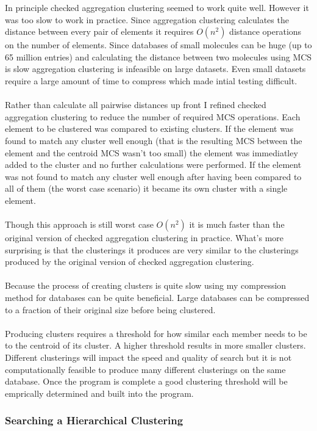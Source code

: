 \documentclass[DIV=calc, paper=a4, fontsize=12pt, twocolumn]{scrartcl}	 %
\begin{document}
In principle checked aggregation clustering seemed to work quite well. However it was too slow to work in practice. Since aggregation clustering calculates the distance between every pair of elements it requires $O(n^2)$ distance operations on the number of elements. Since databases of small molecules can be huge (up to 65 million entries) and calculating the distance between two molecules using MCS is slow aggregation clustering is infeasible on large datasets. Even small datasets require a large amount of time to compress which made intial testing difficult.
\\\\
Rather than calculate all pairwise distances up front I refined checked aggregation clustering to reduce the number of required MCS operations. Each element to be clustered was compared to existing clusters. If the element was found to match any cluster well enough (that is the resulting MCS between the element and the centroid MCS wasn't too small) the element was immediatley added to the cluster and no further calculations were performed. If the element was not found to match any cluster well enough after having been compared to all of them (the worst case scenario) it became its own cluster with a single element. 
\\\\
Though this approach is still worst case $O(n^2)$ it is much faster than the original version of checked aggregation clustering in practice. What's more surprising is that the clusterings it produces are very similar to the clusterings produced by the original version of checked aggregation clustering. 
\\\\
Because the process of creating clusters is quite slow using my compression method for databases can be quite beneficial. Large databases can be compressed to a fraction of their original size before being clustered.
\\\\
Producing clusters requires a threshold for how similar each member needs to be to the centroid of its cluster. A higher threshold results in more smaller clusters. Different clusterings will impact the speed and quality of search but it is not computationally feasible to produce many different clusterings on the same database. Once the program is complete a good clustering threshold will be emprically determined and built into the program.

\subsubsection*{Searching a Hierarchical Clustering}
\end{document}
